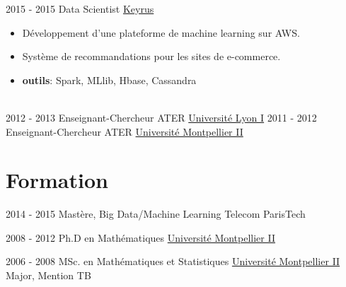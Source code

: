 \documentclass[letterpaper]{twentysecondcvfr} %
\begin{document}
\begin{twenty}
     \twentyitem
   		{2015 - 2015}
		{}
        {Data Scientist}
        {\href{http://www.keyrus.com/}{Keyrus}}
        {}
        {
        \begin{itemize}
        \item D\'eveloppement d'une plateforme de machine learning sur AWS. 
				\item Syst\`eme de recommandations pour les sites de e-commerce.
				\item \textbf{outils}: Spark, MLlib, Hbase, Cassandra
    \end{itemize} }\\
		
	\twentyitem
   		{2012 - 2013}
		{}
        {Enseignant-Chercheur ATER}
        {\href{http://www.univ-lyon1.fr/}{Universit\'e Lyon I}}
        {}
        {}
	\twentyitem
   		{2011 - 2012}
		{}
        {Enseignant-Chercheur ATER}
        {\href{http://www.umontpellier.fr/}{Universit\'e Montpellier II}}
        {}
        {}
        
\end{twenty}





\vspace{-0.5cm}
\section{Formation}{\faGraduationCap}

\begin{twenty} %
	\twentyitemshorttest
    	{2014 - 2015}
        {}
        {Mast\`ere, Big Data/Machine Learning}
        {Telecom ParisTech}{}
				
	\twentyitemshorttest
    	{2008 - 2012}
		{}
        {Ph.D en Math\'ematiques}
        {\href{http://www.umontpellier.fr/}{Universit\'e Montpellier II}}
        {}
				
	\twentyitemshorttest
    	{2006 - 2008}
		{}
        {MSc. en Math\'ematiques et Statistiques}
        {\href{http://www.umontpellier.fr/}{Universit\'e Montpellier II}}
        {Major, Mention TB}
\end{twenty}
\end{document}
